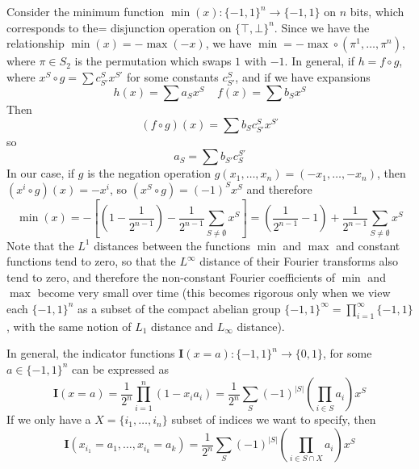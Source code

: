 \begin{example}
    Consider the minimum function $\min(x): \{ -1, 1 \}^n \to \{ -1, 1 \}$ on $n$ bits, which corresponds to the= disjunction operation on $\{ \top, \bot \}^n$. Since we have the relationship $\min(x) = - \max(-x)$, we have $\min = - \max \circ (\pi^1, \dots, \pi^n)$, where $\pi \in S_2$ is the permutation which swaps $1$ with $-1$. In general, if $h = f \circ g$, where $x^S \circ g = \sum c^S_{S'} x^{S'}$ for some constants $c^S_{S'}$, and if we have expansions
    \[ h(x) = \sum a_S x^S\ \ \ \ \ f(x) = \sum b_S x^S \]
    Then
    \[ (f \circ g)(x) = \sum b_S c_{S'}^S x^{S'} \]
    so
    \[ a_S = \sum b_{S'} c^{S'}_S \]
    In our case, if $g$ is the negation operation $g(x_1, \dots, x_n) = (-x_1, \dots, -x_n)$, then $(x^i \circ g)(x) = -x^i$, so $(x^S \circ g) = (-1)^S x^S$ and therefore
    \[ \min(x) = - \left[ \left( 1 - \frac{1}{2^{n-1}} \right) - \frac{1}{2^{n-1}} \sum_{S \neq \emptyset} x^S \right] = \left( \frac{1}{2^{n-1}} - 1 \right) + \frac{1}{2^{n-1}} \sum_{S \neq \emptyset} x^S \]
    Note that the $L^1$ distances between the functions $\min$ and $\max$ and constant functions tend to zero, so that the $L^\infty$ distance of their Fourier transforms also tend to zero, and therefore the non-constant Fourier coefficients of $\min$ and $\max$ become very small over time (this becomes rigorous only when we view each $\{ -1, 1 \}^n$ as a subset of the compact abelian group $\{ -1, 1 \}^\infty = \prod_{i = 1}^\infty \{ -1, 1 \}$, with the same notion of $L_1$ distance and $L_\infty$ distance).
\end{example}

\begin{example}
    In general, the indicator functions $\mathbf{I}(x = a): \{ -1, 1 \}^n \to \{ 0, 1 \}$, for some $a \in \{ -1, 1 \}^n$ can be expressed as
    \[ \mathbf{I}(x = a) = \frac{1}{2^n} \prod_{i = 1}^n \left( 1 - x_i a_i \right) = \frac{1}{2^n} \sum_S (-1)^{|S|} \left( \prod_{i \in S} a_i \right) x^S \]
    If we only have a $X = \{ i_1, \dots, i_n \}$ subset of indices we want to specify, then
    \[ \mathbf{I}(x_{i_1} = a_1, \dots, x_{i_k} = a_k) = \frac{1}{2^n} \sum_S (-1)^{|S|} \left( \prod_{i \in S \cap  X} a_i \right) x^S \]
\end{example}


